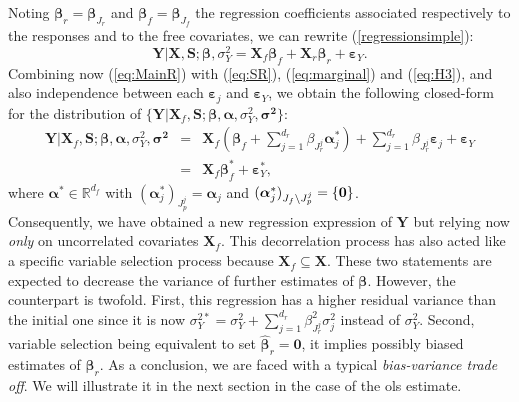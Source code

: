 \documentclass[11pt,a4paper]{article}
\begin{document}
Noting $\boldsymbol{\beta}_r=\boldsymbol{\beta}_{J_r}$ and $\boldsymbol{\beta}_f=\boldsymbol{\beta}_{J_f}$ the regression coefficients associated respectively to the responses and to the free covariates, we can rewrite (\ref{regressionsimple}):
\begin{equation}
			\boldsymbol{Y}{|\boldsymbol{X},\boldsymbol{S}};\boldsymbol{\beta},\sigma_Y^2=\boldsymbol{X}_f\boldsymbol{\beta}_f+\boldsymbol{X}_r\boldsymbol{\beta}_r+\boldsymbol{\varepsilon}_Y. \label{eq:MainR}
\end{equation}
Combining now (\ref{eq:MainR}) with (\ref{eq:SR}), (\ref{eq:marginal}) and (\ref{eq:H3}), and also independence between each $\boldsymbol{\varepsilon}_j$ and $\boldsymbol{\varepsilon}_Y$, we obtain the following closed-form for the distribution of $\{\boldsymbol{Y} |\boldsymbol{X}_f,\boldsymbol{S};\boldsymbol{\beta},\boldsymbol{\alpha},\sigma_Y^2,\boldsymbol{\sigma^2}\}$:
\begin{eqnarray}
	\boldsymbol{Y}{|\boldsymbol{X}_f,\boldsymbol{S}};\boldsymbol{\beta},\boldsymbol{\alpha},\sigma_Y^2,\boldsymbol{\sigma^2}&=&\boldsymbol{X}_f (\boldsymbol{\beta}_f+ \sum_{j =1}^{d_r}\beta_{J_r^j}\boldsymbol{\alpha}_j^*)+  \sum_{j =1}^{d_r}\beta_{J_r^j}\boldsymbol{\varepsilon}_j+\boldsymbol{\varepsilon}_Y \label{eq:Trueexpl} \\
	&=&\boldsymbol{X}_f\boldsymbol{\beta}_f^*+\boldsymbol{\varepsilon}_Y^*,\label{eq:modexpl}
\end{eqnarray}
where $\boldsymbol{\alpha}^* \in \mathbb{R}^{d_f}$ with $(\boldsymbol{\alpha}_j^*)_{J_p^j}=\boldsymbol{\alpha}_j $ and $(\boldsymbol{\alpha}_j^*)_{J_f\setminus J_p^j}=\{\bf 0 \} $. \\
Consequently, we have obtained a new regression expression of $\boldsymbol{Y}$ but relying now {\it only} on uncorrelated covariates $\boldsymbol{X}_f$. This decorrelation process has also acted like a specific variable selection process because $\boldsymbol{X}_f \subseteq \boldsymbol{X}$. These two statements are expected to decrease the variance of further estimates of $\boldsymbol{\beta}$. However, the counterpart is twofold. First, this regression has a higher residual variance than the initial one since it is now $\sigma^{2*}_Y=\sigma^2_Y+\sum_{j =1}^{d_r}\beta_{J_r^j}^2\sigma^2_j$ instead of $\sigma^2_Y$. Second, variable selection being equivalent to set $\hat{\boldsymbol{\beta}}_r=\boldsymbol{0}$, it implies possibly biased estimates of $\boldsymbol{\beta}_r$. As a conclusion, we are faced with a typical {\it bias-variance trade off}. We will illustrate it in the next section in the case of the {\sc ols} estimate.
\end{document}
